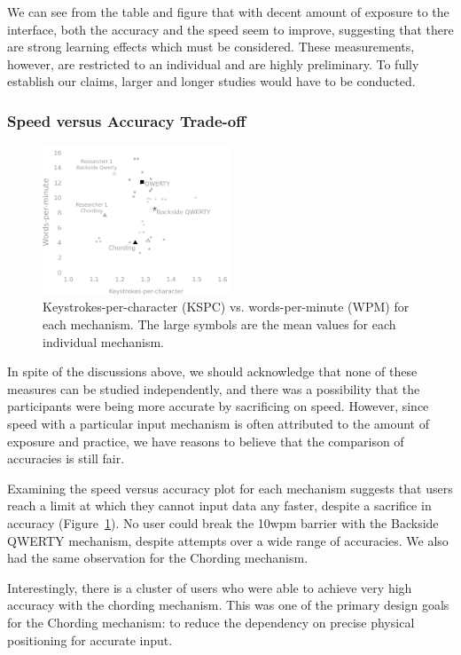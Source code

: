 We can see from the table and figure that with decent amount of
exposure to the interface, both the accuracy and the speed seem to
improve, suggesting that there are strong learning effects which must
be considered.  These measurements, however, are restricted to an
individual and are highly preliminary. To fully establish our claims,
larger and longer studies would have to be conducted.

\subsubsection{Speed versus Accuracy Trade-off}

\begin{figure}
    \includegraphics[width=0.5\textwidth]{Figures/kspc_vs_wpm.pdf} 
    \caption{Keystrokes-per-character (KSPC) vs. words-per-minute
      (WPM) for each mechanism.  The large symbols are the mean values
      for each individual mechanism. }
    \label{fig:kspc_vs_wpm}
\end{figure}

In spite of the discussions above, we should acknowledge that none of
these measures can be studied independently, and there was a
possibility that the participants were being more accurate by
sacrificing on speed. However, since speed with a particular input
mechanism is often attributed to the amount of exposure and practice,
we have reasons to believe that the comparison of accuracies is still fair. 

Examining the speed versus accuracy plot for each mechanism suggests
that users reach a limit at which they cannot input data any faster,
despite a sacrifice in accuracy (Figure~\ref{fig:kspc_vs_wpm}).  No
user could break the 10wpm barrier with the Backside QWERTY mechanism,
despite attempts over a wide range of accuracies.  We also had the same observation for the Chording mechanism.

Interestingly, there is a cluster of users who were able to achieve
very high accuracy with the chording mechanism.  This was one of the
primary design goals for the Chording mechanism: to reduce the dependency on precise physical positioning for accurate input.

